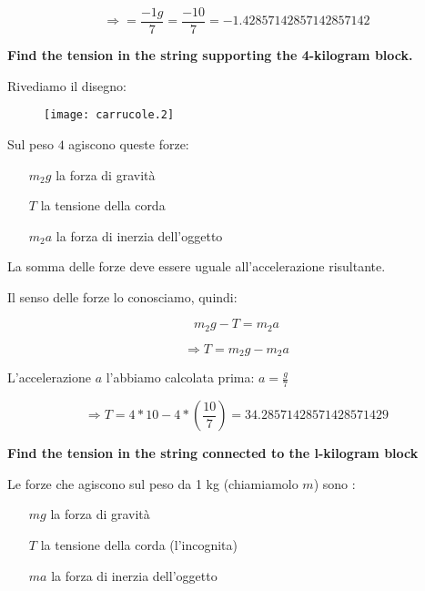 \begin{enumerate}
\begin{equation}
\Rightarrow
=\frac{ -1g }{ 7 }
=\frac{ -10 }{ 7 }
=-1.42857142857142857142
\end{equation}

\setcounter{equation}{0}
\begin{minipage}{\textwidth}


\item \textbf{Find the tension in the string supporting the 4-kilogram block.}

Rivediamo il disegno:

\begin{figure}[H]
\centering
\texttt{[image: carrucole.2]}
\end{figure}

Sul peso $4$ agiscono queste forze:

\begin{enumerate}
\item[$m_2g$] la forza di gravità
\item[$T$] la tensione della corda
\item[$m_2a$] la forza di inerzia dell'oggetto
\end{enumerate}

La somma delle forze deve essere uguale all'accelerazione risultante.

Il senso delle forze lo conosciamo, quindi:

\end{minipage}

\begin{equation}
m_2g-T=m_2a
\end{equation}

\begin{equation}
\Rightarrow
T=m_2g-m_2a
\end{equation}

L'accelerazione $a$ l'abbiamo calcolata prima: $ a=\frac{g}{7}$

\begin{equation}
\Rightarrow
T=4*10-4*(\frac{10}{7})=34.28571428571428571429
\end{equation}

\begin{minipage}{\textwidth}
\item \textbf{Find the tension in the string connected to the l-kilogram block}

Le forze che agiscono sul peso da 1 kg (chiamiamolo $m$) sono :

\setcounter{equation}{0}
\begin{enumerate}
\item[$mg$] la forza di gravità
\item[$T$] la tensione della corda (l'incognita)
\item[$ma$] la forza di inerzia dell'oggetto
\end{enumerate}


\end{minipage}
\end{enumerate}
